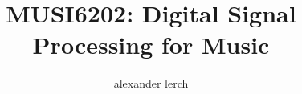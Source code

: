 \title[]{MUSI6202: Digital Signal Processing for Music}   
\author[alexander lerch]{alexander lerch} 
